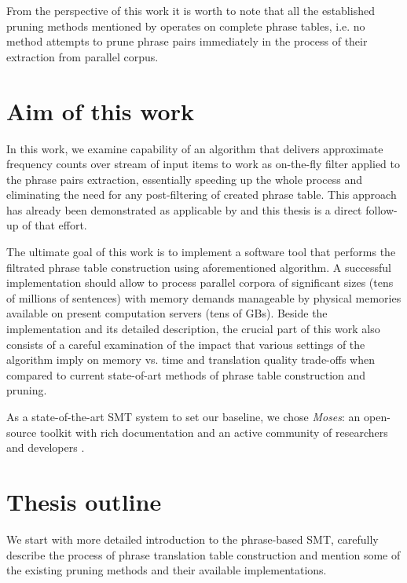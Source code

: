 From the perspective of this work it is worth to note that all the established pruning methods
mentioned by \citet{zens:systcomp} operates on complete phrase tables, i.e. no method attempts
to prune phrase pairs immediately in the process of their extraction from parallel corpus.

\section{Aim of this work}

In this work, we examine capability of an algorithm that delivers approximate
frequency counts over stream of input items \citep{manku:lossycounting} to
work as on-the-fly filter applied to the phrase pairs extraction,
essentially speeding up the whole process and eliminating the need for
any post-filtering of created phrase table.
This approach has already been demonstrated as applicable by \citet{przywara:eppex}
and this thesis is a direct follow-up of that effort.

The ultimate goal of this work is to implement a software tool that performs
the filtrated phrase table construction using aforementioned algorithm.
A successful implementation should allow to process parallel corpora of
significant sizes (tens of millions of sentences) with memory demands manageable
by physical memories available on present computation servers (tens of GBs).
Beside the implementation and its detailed description, the crucial part of
this work also consists of a careful examination of the impact that various
settings of the algorithm imply on memory vs. time and translation quality
trade-offs when compared to current state-of-art methods of phrase table
construction and pruning.

As a state-of-the-art SMT system to set our baseline, we chose \emph{Moses}:
an open-source toolkit with rich documentation and an active community of researchers
and developers \citep{koehn:moses}.

\section{Thesis outline}

We start with more detailed introduction to the phrase-based SMT,
carefully describe the process of phrase translation table construction
and mention some of the existing pruning methods and their available
implementations.

